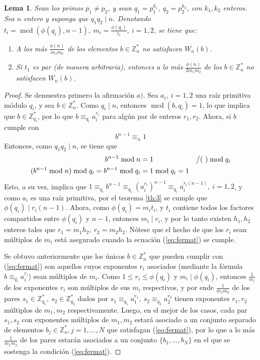 \documentclass[hidelinks, 12pt]{article}
\newcommand{\Zs}{\mathbb{Z}^*}
\DeclareMathOperator{\mcd}{mcd}
\newtheorem{lemma}{Lema}[section]
\begin{document}
\begin{lemma}
\label{le:4.2}
    Sean los primos $p_1\neq p_2$, y sean $q_1=p_1^{k_1},~q_2=p_2^{k_2}$, con $k_1,k_2$ enteros. Sea $n$ entero y suponga que $q_1q_2\mid n$. Denotando $t_i=\mcd(\phi(q_i),n-1),~m_i=\frac{\phi(q_i)}{t_i},~i=1,2$, se tiene que:
    \begin{enumerate}[label=\alph*\textup{)}]
        \item A los más $\frac{\phi(n)}{m_1m_2}$ de los elementos $b\in\Zs_n$ no satisfacen $W_n(b)$.
        \item Si $t_1$ es par (de manera arbitraria), entonces a lo más $\frac{\phi(n)}{2m_1m_2}$ de los $b\in\Zs_n$ no satisfacen $W_n(b)$.
    \end{enumerate}
\end{lemma}
\begin{proof}
    Se demuestra primero la afirmación $a)$. Sea $a_i,~i=1,2$ una raíz primitiva módulo $q_i$, y sea $b\in\Zs_n$. Como $q_i\mid n$, entonces $\mcd(b,q_i)=1$, lo que implica que $b\in\Zs_{q_i}$, por lo que $b\equiv_{q_i}a_i^{r_i}$ para algún par de enteros $r_1,r_2$. Ahora, si $b$ cumple con
    \begin{equation}
        b^{n-1}\equiv_n 1
        \label{eq:fermat}
    \end{equation}
    Entonces, como $q_1q_2\mid n$, se tiene que
    \begin{align*}
        b^{n-1}\bmod n&=1&&\big{/}(~)\bmod q_i \\
        (b^{n-1}\bmod n)\bmod q_i=b^{n-1}\bmod q_i&=1\bmod q_i=1
    \end{align*}
    Esto, a su vez, implica que $1\equiv_{q_i}b^{n-1}\equiv_{q_i}(a_i^{r_i})^{n-1}\equiv_{q_i}a_i^{r_i(n-1)},~i=1,2$, y como $a_i$ es una raíz primitiva, por el teorema \ref{th:3} se cumple que $\phi(q_i)\mid r_i(n-1)$. Ahora, como $\phi(q_i)=m_it_i$, y $t_i$ contiene todos los factores compartidos entre $\phi(q_i)$ y $n-1$, entonces $m_i\mid r_i$, y por lo tanto existen $h_1,h_2$ enteros tales que $r_1=m_1h_2,~r_2=m_2h_2$. Nótese que el hecho de que los $r_i$ sean múltiplos de $m_i$ está asegurado cuando la ecuación (\ref{eq:fermat}) se cumple.

    Se obtuvo anteriormente que los únicos $b\in\Zs_n$ que pueden cumplir con (\ref{eq:fermat}) son aquellos cuyos exponentes $r_i$ asociados (mediante la fórmula $b\equiv_{q_i}a_i^{r_i}$) sean múltiplos de $m_i$. Como $1\leq r_i\leq\phi(q_i)$ y $m_i\mid\phi(q_i)$, entonces $\frac{1}{m_i}$ de los exponentes $r_i$ son múltiplos de sus $m_i$ respectivos, y por ende $\frac{1}{m_1m_2}$ de los pares $s_1\in\Zs_{q_1},~s_2\in\Zs_{q_2}$ dados por $s_1\equiv_{q_1}a_1^{r_1},~s_2\equiv_{q_2}a_2^{r_2}$ tienen exponentes $r_1,r_2$ múltiplos de $m_1,m_2$ respectivamente. Luego, en el mejor de los casos, cada par $s_1,s_2$ con exponentes múltiplos de $m_1,m_2$ estará asociado a un conjunto separado de elementos $b_j\in\Zs_n,j=1,\dots,N$ que satisfagan (\ref{eq:fermat}), por lo que a lo más $\frac{1}{m_1m_2}$ de los pares estarán asociados a un conjunto $\{b_1,\dots,b_N\}$ en el que se sostenga la condición (\ref{eq:fermat}).


\end{proof}
\end{document}
